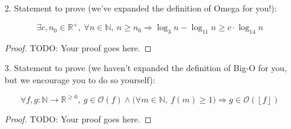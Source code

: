 \documentclass[fontsize=11pt]{article}
\newcommand{\N}{\mathbb{N}}
\newcommand{\Z}{\mathbb{Z}}
\newcommand{\R}{\mathbb{R}}
\newcommand{\cO}{\mathcal{O}}
\newcommand{\floor}[1]{\left\lfloor #1 \right\rfloor}
\begin{document}
\begin{enumerate}
\begin{proof}
\begin{enumerate}
    \item[3.] Proving for $\forall e \in \N, e | (a + kn) \land e | n \implies e \le 1$ \\
        Let $e \in \N$ \\
        Suppose $e | (a + kn) \land e | n$ \\
        $a + kn = ex \land n = ey$ for some $x,y \in \Z$ \\
        $a + key = ex$ for some $x,y \in \Z$ \\
        $a = e(x - ky)$ for some $x,y \in \Z$ \\
        Let $c = (x - ky)$ \\
        By substitution, we now have: $a = ec$ \\
        Therefore, $\exists c \in \Z$ s.t. $a = ec$ is true. \\
        Which means $e | a$ is true. \\
        Since we are given $\forall e_2 \in \N, e_2 | a \land e_2 | n \implies e_2 \le 1$ \\
        Take $e_2 = e$, we now have $e | a \land e | n \implies e \le 1$ \\
        And since we now know $e | a$ and $e | n$, we can conclude $e \le 1$. \\
        Which is what we want to show.
\end{enumerate}


\end{proof}

\item[2.] Statement to prove (we've expanded the definition of Omega for you!):

$$\exists c, n_0 \in \R^+,~ \forall n \in \N,~ n \geq n_0 \Rightarrow \log_{3} n - \log_{11} n \geq c \cdot \log_{14} n$$

\begin{proof}
TODO: Your proof goes here.
\end{proof}

\item[3.] Statement to prove (we haven't expanded the definition of Big-O for you, but we encourage you to do so yourself):

$$\forall f, g: \N \to \R^{\geq 0},~ g \in \cO(f) \land \big(\forall m \in \N,~ f(m) \geq 1 \big) \Rightarrow g \in \cO(\floor{f})$$

\begin{proof}
TODO: Your proof goes here.
\end{proof}

\end{enumerate}
\end{document}
